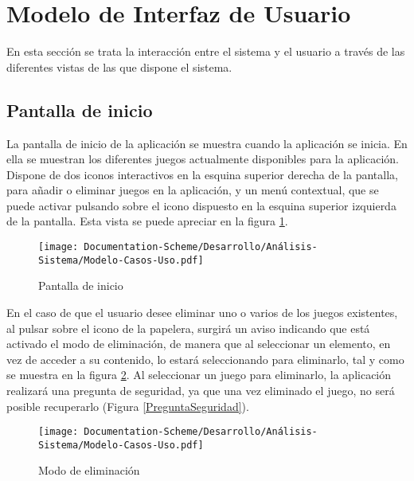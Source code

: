 
\section{Modelo de Interfaz de Usuario}
En esta sección se trata la interacción entre el sistema y el usuario a través de las diferentes vistas 
de las que dispone el sistema.

\subsection{Pantalla de inicio}
La pantalla de inicio de la aplicación se muestra cuando la aplicación se inicia. En ella se 
muestran los diferentes juegos actualmente disponibles para la aplicación.
Dispone de dos iconos interactivos en la esquina superior derecha de la pantalla, para añadir o eliminar 
juegos en la aplicación, y un menú contextual, que se puede activar pulsando sobre el icono dispuesto 
en la esquina superior izquierda de la pantalla. Esta vista se puede apreciar en la figura \ref*{PantallaInicio}.

\begin{figure}[H]
    \centering
    \texttt{[image: Documentation-Scheme/Desarrollo/Análisis-Sistema/Modelo-Casos-Uso.pdf]}
    \caption{Pantalla de inicio}
    \label{PantallaInicio}    
\end{figure}

En el caso de que el usuario desee eliminar uno o varios de los juegos existentes, al pulsar sobre el 
icono de la papelera, surgirá un aviso indicando que está activado el modo de eliminación, de manera que 
al seleccionar un elemento, en vez de acceder a su contenido, lo estará seleccionando para eliminarlo, tal 
y como se muestra en la figura \ref*{ModoEliminacion}. Al seleccionar un juego para eliminarlo, 
la aplicación realizará una pregunta de seguridad, ya que una vez eliminado el juego, no será posible 
recuperarlo (Figura \ref{PreguntaSeguridad}).

\begin{figure}[H]
    \centering
    \texttt{[image: Documentation-Scheme/Desarrollo/Análisis-Sistema/Modelo-Casos-Uso.pdf]}
    \caption{Modo de eliminación}
    \label{ModoEliminacion}    
\end{figure}

